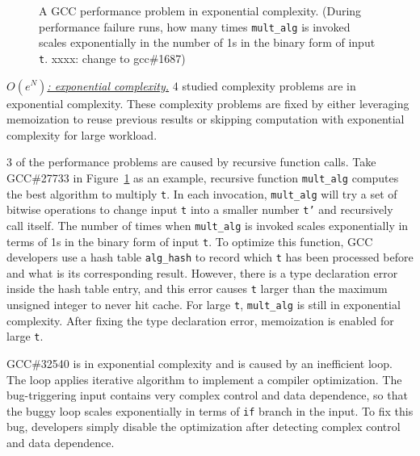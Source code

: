 \begin{figure}
\centering
{}
  \mbox{}
\caption{A GCC performance problem in exponential complexity. 
 (During performance failure runs, how many times \texttt{mult\_alg} is invoked scales exponentially
  in the number of 1s in the binary form of input \texttt{t}.
  xxxx: change to gcc\#1687)}
\vspace{-0.05in}
\label{fig:gcc27733}
\vspace{-0.05in}
\end{figure}


{\underline{\textit{$O(e^N)$: exponential complexity.}}}
4 studied complexity problems are in exponential complexity. 
These complexity problems are fixed by 
either leveraging memoization to reuse previous results 
or skipping computation with exponential complexity for large workload. 

3 of the performance problems are caused by recursive function calls. 
Take GCC\#27733 in Figure~\ref{fig:gcc27733} as an example, 
recursive function \texttt{mult\_alg} computes the best algorithm to multiply \texttt{t}.
In each invocation, \texttt{mult\_alg} will try a set of bitwise 
operations to change input 
\texttt{t} into a smaller number \texttt{t'} and recursively call itself. 
The number of times when \texttt{mult\_alg} is invoked scales exponentially 
in terms of 1s in the binary form of input \texttt{t}. 
To optimize this function, 
GCC developers use a hash table \texttt{alg\_hash} to record
which \texttt{t} has been processed before and what is its corresponding result.
However, there is a type declaration error inside the hash table entry,
and this error causes \texttt{t} larger than the maximum unsigned integer to never hit cache.
For large \texttt{t}, \texttt{mult\_alg} is still in exponential complexity. 
After fixing the type declaration error, 
memoization is enabled for large \texttt{t}. 

GCC\#32540 is in exponential complexity and is caused by an inefficient loop. 
The loop applies iterative algorithm to implement a compiler optimization. 
The bug-triggering input contains very complex control and data dependence,  
so that the buggy loop scales exponentially in terms of \texttt{if} branch in the input. 
To fix this bug, developers simply disable the optimization 
after detecting complex control and data dependence.  



